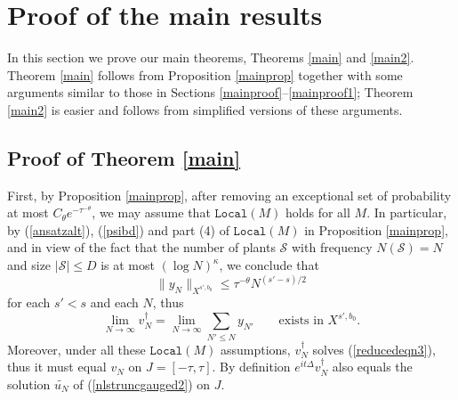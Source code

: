 \documentclass[11 pt,reqno]{amsart}
\theoremstyle{definition}
\theoremstyle{remark}
\numberwithin{equation}{section}
\newcommand{\Sc}{\mathcal{S}}
\begin{document}
{\section{Proof of the main results}\label{proofmain} In this section we prove our main theorems, Theorems \ref{main} and \ref{main2}. Theorem \ref{main} follows from Proposition \ref{mainprop} together with some arguments similar to those in Sections \ref{mainproof}--\ref{mainproof1}; Theorem \ref{main2} is easier and follows from simplified versions of these arguments.
\subsection{Proof of Theorem \ref{main}} First,  by Proposition \ref{mainprop}, after removing an exceptional set of probability at most $C_\theta e^{-\tau^{-\theta}}$, we may assume that $\mathtt{Local}(M)$ holds for all $M$. In particular, by (\ref{ansatzalt}), (\ref{psibd}) and part (4) of $\mathtt{Local}(M)$ in Proposition \ref{mainprop}, and in view of the fact that the number of plants $\Sc$ with frequency $N(\Sc)=N$ and size $|\Sc|\leq D$ is at most $(\log N)^{\kappa}$, we conclude that
\begin{equation}\label{ynbound}\|y_N\|_{X^{s',b_0}}\leq \tau^{-\theta} N^{(s'-s)/2}\end{equation} for each $s'<s$ and each $N$, thus \begin{equation}\label{limit1}\lim_{N\to\infty}v_N^\dagger=\lim_{N\to\infty}\sum_{N'\leq N}y_{N'}\qquad \textrm{exists in }X^{s',b_0}.\end{equation} Moreover, under all these $\mathtt{Local}(M)$ assumptions, $v_N^\dagger$  solves (\ref{reducedeqn3}), thus it must equal $v_N$ on $J=[-\tau,\tau]$. By definition $e^{it\Delta}v_N^\dagger$ also equals the solution $\widetilde{u_N}$  of (\ref{nlstruncgauged2}) on $J$.

}
\end{document}
